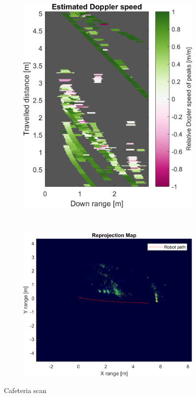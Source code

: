 \begin{figure}[htbp]
\begin{subfigure}[t]{0.475\linewidth}
        \includegraphics[width=\linewidth,max height=.475\textheight]{gfx/results/cafeteria_doppler.png}
    \end{subfigure}\bigskip\\
    \begin{subfigure}[t]{0.5\linewidth}
        \centering
        \includegraphics[width=\linewidth,max height=.475\textheight]{gfx/results/cafeteria_reprojection.png}
    \end{subfigure}%
    \caption{Cafeteria scan}
\end{figure}

